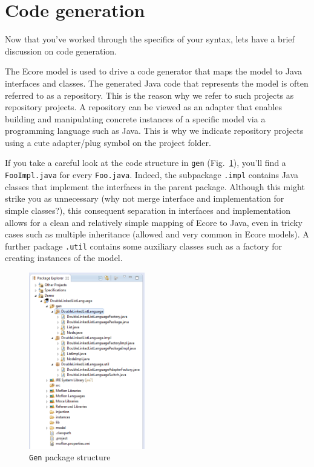 \newpage
\genHeader

\section{Code generation}

Now\hypertarget{codeGen common}{} that you've worked through the specifics of your syntax, lets have a brief discussion on code generation.

The Ecore model is used to drive a code generator that maps the model to Java interfaces and classes.
The generated Java code that represents the model is often referred to as a repository. This is the reason why we refer to such projects as repository projects.
A repository can be viewed as an adapter that enables building and manipulating concrete instances of a specific model via a programming language such as Java.
This is why we indicate repository projects using a cute adapter/plug symbol on the project folder.


If you take a careful look at the code structure in \texttt{gen} (Fig.~\ref{fig_structureGen}), you'll find a \texttt{FooImpl.java} for every \texttt{Foo.java}.
Indeed, the subpackage \texttt{.impl} contains Java classes that implement the interfaces in the parent package. Although this might strike you as unnecessary
(why not merge interface and implementation for simple classes?), this consequent separation in interfaces and implementation allows for a clean and relatively
simple mapping of Ecore to Java, even in tricky cases such as multiple inheritance (allowed and very common in Ecore models).
A further package \texttt{.util} contains some auxiliary classes such as a factory for creating instances of the model.

 \begin{figure}[htbp]
  \centering
  \includegraphics[width=0.45\textwidth]{eclipse_structureGen}
  \caption{\texttt{Gen} package structure}
  \label{fig_structureGen}
\end{figure}


